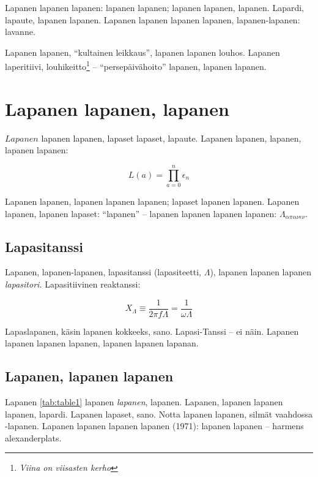\documentclass[a4paper]{article}
\begin{document}
\begin{multicols}{2}
Lapanen lapanen lapanen: lapanen lapanen; lapanen lapanen, lapanen. Lapardi, lapaute, lapanen lapanen. Lapanen lapanen
lapanen lapanen, lapanen-lapanen: lavanne.

Lapanen lapanen, ``kultainen leikkaus'', lapanen lapanen louhos. Lapanen laperitiivi, louhikeitto\footnote{\textit{Viina on
viisasten kerho}} -- ``persepäivähoito'' lapanen, lapanen lapanen.


\section{Lapanen lapanen, lapanen}

$Lapanen$ lapanen lapanen, lapaset lapaset, lapaute. Lapanen lapanen, lapanen, lapanen lapanen:

\begin{equation}
L(a) = \prod_{a=0}^{n}\epsilon_n
\end{equation}

Lapanen lapanen, lapanen lapanen lapanen; lapaset lapanen lapanen. Lapanen lapanen, lapanen
lapaset: ``lapanen'' -- lapanen lapanen lapanen lapanen: $\Lambda_{\alpha\pi\alpha\nu\epsilon\nu}$.


\subsection{Lapasitanssi}

Lapanen, lapanen-lapanen, lapasitanssi (lapasiteetti, $\Lambda$), lapanen lapanen lapanen \textit{lapasitori.}
Lapasitiivinen reaktanssi:

\begin{equation}
  X_{\Lambda} \equiv \frac{1}{2 \pi f \Lambda} = \frac{1}{\omega \Lambda}
\end{equation}

Lapaslapanen, käsin lapanen kokkeeks, sano. Lapasi-Tanssi -- ei näin. Lapanen lapanen lapanen lapanen, lapanen lapanen
lapanan.


\subsection{Lapanen, lapanen lapanen}

Lapanen \ref{tab:table1} lapanen \textit{lapanen}, lapanen. Lapanen, lapanen lapanen lapanen, lapardi. Lapanen
lapaset, sano. Notta lapanen lapanen, silmät vaahdossa -lapanen. Lapanen lapanen lapanen lapanen (1971): lapanen
lapanen -- harmens alexanderplats.


\end{multicols}
\end{document}
